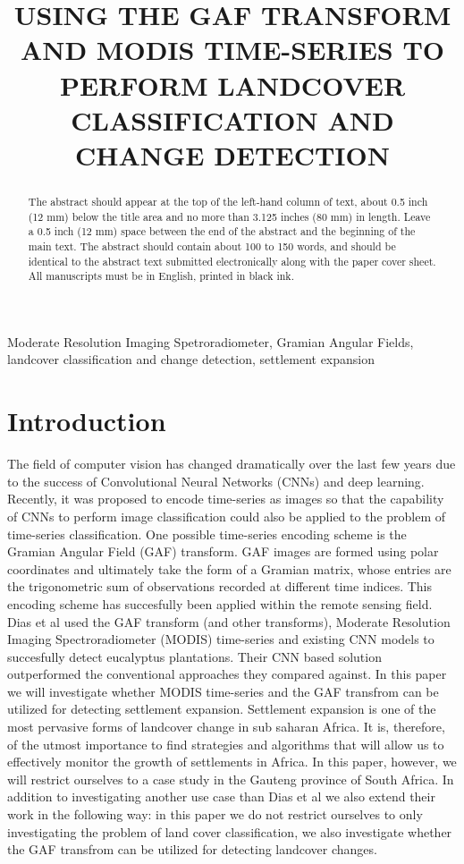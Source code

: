 \documentclass{article}
\title{USING THE GAF TRANSFORM AND MODIS TIME-SERIES TO PERFORM LANDCOVER CLASSIFICATION AND CHANGE DETECTION}
\begin{document}
%
\maketitle
%
\begin{abstract}
The abstract should appear at the top of the left-hand column of text, about
0.5 inch (12 mm) below the title area and no more than 3.125 inches (80 mm) in
length.  Leave a 0.5 inch (12 mm) space between the end of the abstract and the
beginning of the main text.  The abstract should contain about 100 to 150
words, and should be identical to the abstract text submitted electronically
along with the paper cover sheet.  All manuscripts must be in English, printed
in black ink.
\end{abstract}
%
\begin{keywords}
Moderate Resolution Imaging Spetroradiometer, Gramian Angular Fields, landcover classification and change detection, settlement expansion
\end{keywords}
%
\section{Introduction}
\label{sec:intro}
The field of computer vision has changed dramatically over the last few years due to the success of Convolutional Neural Networks (CNNs) and deep learning. Recently, it was proposed to encode time-series as images so that the capability of CNNs to perform image classification could also be applied to the problem of time-series classification. One possible time-series encoding scheme is the Gramian Angular Field (GAF) transform. GAF images are formed using polar coordinates and ultimately take the form of a Gramian matrix, whose entries are the trigonometric sum of observations recorded at different time indices. This encoding scheme has succesfully been applied within the remote sensing field. Dias et al used the GAF transform (and other transforms), Moderate Resolution Imaging Spectroradiometer (MODIS) time-series and existing CNN models to succesfully detect eucalyptus plantations. Their CNN based solution outperformed the conventional approaches they compared against. In this paper we will investigate whether MODIS time-series and the GAF transfrom can be utilized for detecting settlement expansion. Settlement expansion is one of the most pervasive forms of landcover change in sub saharan Africa. It is, therefore, of the utmost importance to find strategies and algorithms that will allow us to effectively monitor the growth of settlements in Africa. In this paper, however, we will restrict ourselves to a case study in the Gauteng province of South Africa. In addition to investigating another use case than Dias et al we also extend their work in the following way: in this paper we do not restrict ourselves to only investigating the problem of land cover classification, we also investigate whether the GAF transfrom can be utilized for detecting landcover changes.  
\end{document}
